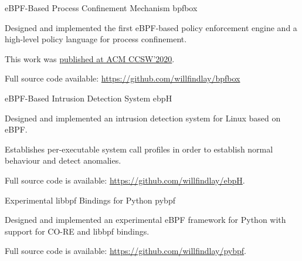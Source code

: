 


\begin{cventries}

  \cventry
    {eBPF-Based Process Confinement Mechanism} %
    {bpfbox} %
    {} %
    {} %
    {
      \begin{cvitems} %
        \item Designed and implemented the first eBPF-based policy enforcement engine and a high-level policy language for process confinement.
        \item This work was \href{https://dl.acm.org/doi/10.1145/3411495.3421358}{published at ACM CCSW'2020}.
        \item Full source code available: \url{https://github.com/willfindlay/bpfbox}
      \end{cvitems}
    }

  \cventry
    {eBPF-Based Intrusion Detection System} %
    {ebpH} %
    {} %
    {} %
    {
      \begin{cvitems} %
        \item Designed and implemented an intrusion detection system for Linux based on eBPF.
        \item Establishes per-executable system call profiles in order to establish normal behaviour and detect anomalies.
        \item Full source code is available: \url{https://github.com/willfindlay/ebpH}.
      \end{cvitems}
    }

  \cventry
    {Experimental libbpf Bindings for Python} %
    {pybpf} %
    {} %
    {} %
    {
      \begin{cvitems} %
        \item Designed and implemented an experimental eBPF framework for Python with support for CO-RE and libbpf bindings.
        \item Full source code is available: \url{https://github.com/willfindlay/pybpf}.
      \end{cvitems}
    }

\end{cventries}


